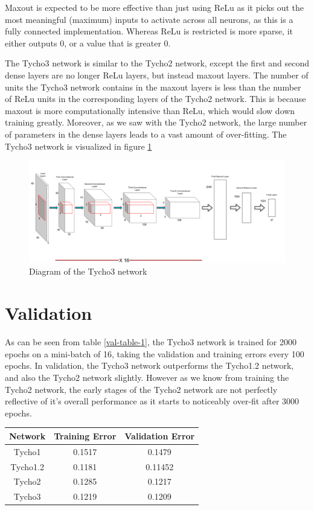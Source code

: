 \documentclass[12pt,a4paper,oneside,oldfontcommands]{memoir}
\begin{document}
\begin{Declaration Of OriginalityOrginality}
Maxout is expected to be more effective than just using ReLu as it picks out the most meaningful (maximum) inputs to activate across all neurons, as this is a fully connected implementation. Whereas ReLu is restricted is more sparse, it either outputs 0, or a value that is greater 0.

The Tycho3 network is similar to the Tycho2 network, except the first and second dense layers are no longer ReLu layers, but instead maxout layers. The number of units the Tycho3 network contains in the maxout layers is less than the number of ReLu units in the corresponding layers of the Tycho2 network. This is because maxout is more computationally intensive than ReLu, which would slow down training greatly. Moreover, as we saw with the Tycho2 network, the large number of parameters in the dense layers leads to a vast amount of over-fitting. The Tycho3 network is visualized in figure \ref{fig:tycho-3-diagram}

\begin{figure}[H]
  \centering
    \includegraphics[width=\linewidth]{images/Tycho3.png}
    \caption{Diagram of the Tycho3 network}
   \label{fig:tycho-3-diagram}
\end{figure}


\section{Validation}

As can be seen from table \ref{val-table-1}, the Tycho3 network is trained for 2000 epochs on a mini-batch of 16, taking the validation and training errors every 100 epochs. In validation, the Tycho3 network outperforms the Tycho1.2 network, and also the Tycho2 network slightly. However as we know from training the Tycho2 network, the early stages of the Tycho2 network are not perfectly reflective of it's overall performance as it starts to noticeably over-fit after 3000 epochs. 

\begin{center} \label{val-table-1}
 \begin{tabular}{||c | c | c||} 
 \hline
 Network & Training Error & Validation Error \\ [0.5ex] 
 \hline\hline
 Tycho1 & 0.1517 & 0.1479\\ 
 \hline
 Tycho1.2 & 0.1181 & 0.11452\\
 \hline
 Tycho2 & 0.1285 & 0.1217\\
 \hline
 Tycho3 & 0.1219 & 0.1209\\
 \hline
\end{tabular}
\end{center}


\end{Declaration Of OriginalityOrginality}
\end{document}
